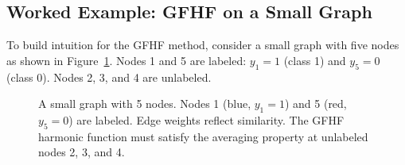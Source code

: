 \documentclass[12pt]{article}
\begin{document}
\subsection{Worked Example: GFHF on a Small Graph}

To build intuition for the GFHF method, consider a small graph with five nodes as shown in Figure~\ref{fig:toy_graph}. Nodes 1 and 5 are labeled: $y_1 = 1$ (class 1) and $y_5 = 0$ (class 0). Nodes 2, 3, and 4 are unlabeled.

\begin{figure}[H]
\centering
{}
\caption{A small graph with 5 nodes. Nodes 1 (blue, $y_1=1$) and 5 (red, $y_5=0$) are labeled. Edge weights reflect similarity. The GFHF harmonic function must satisfy the averaging property at unlabeled nodes 2, 3, and 4.}
\label{fig:toy_graph}
\end{figure}
\end{document}

